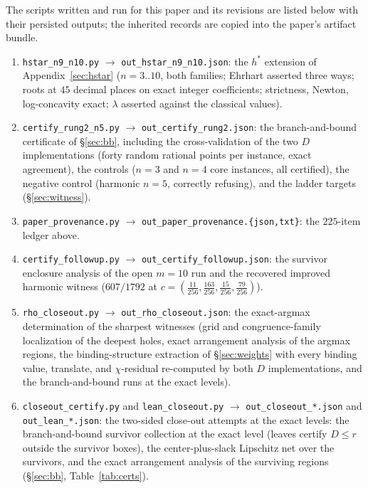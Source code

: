 \documentclass[11pt,a4paper]{article}
\numberwithin{equation}{section}
\theoremstyle{plain}
\theoremstyle{definition}
\theoremstyle{remark}
\begin{document}
The scripts written and run for this paper and its revisions are listed
below with their persisted outputs; the inherited records are copied
into the paper's artifact bundle.

\begin{enumerate}[leftmargin=1.6em,itemsep=2pt]
\item \texttt{hstar\_n9\_n10.py} $\to$ \texttt{out\_hstar\_n9\_n10.json}:
the $h^*$ extension of Appendix~\ref{sec:hstar} ($n=3..10$, both
families; Ehrhart asserted three ways; roots at $45$ decimal places on
exact integer coefficients; strictness, Newton, log-concavity exact;
$\lambda$ asserted against the classical values).
\item \texttt{certify\_rung2\_n5.py} $\to$
\texttt{out\_certify\_rung2.json}: the branch-and-bound certificate of
\S\ref{sec:bb}, including the cross-validation of the two $D$
implementations (forty random rational points per instance, exact
agreement), the controls ($n=3$ and $n=4$ core instances, all
certified), the negative control (harmonic $n=5$, correctly refusing),
and the ladder targets (\S\ref{sec:witness}).
\item \texttt{paper\_provenance.py} $\to$
\texttt{out\_paper\_provenance.\{json,txt\}}: the $225$-item ledger
above.
\item \texttt{certify\_followup.py} $\to$
\texttt{out\_certify\_followup.json}: the survivor enclosure analysis
of the open $m=10$ run and the recovered improved harmonic witness
($607/1792$ at $c=(\tfrac{11}{256},\tfrac{163}{256},
\tfrac{15}{256},\tfrac{79}{256})$).
\item \texttt{rho\_closeout.py} $\to$ \texttt{out\_rho\_closeout.json}:
the exact-argmax determination of the sharpest witnesses (grid and
congruence-family localization of the deepest holes, exact arrangement
analysis of the argmax regions, the binding-structure extraction of
\S\ref{sec:weights} with every binding value, translate, and
$\chi$-residual re-computed by both $D$ implementations, and the
branch-and-bound runs at the exact levels).
\item {\sloppy\texttt{closeout\_certify.py} and \texttt{lean\_closeout.py} $\to$
\texttt{out\_closeout\_*.json} and \texttt{out\_lean\_*.json}: the
two-sided close-out attempts at the exact levels: the branch-and-bound
survivor collection at the exact level (leaves certify $D\le r$ outside
the survivor boxes), the center-plus-slack Lipschitz net over the
survivors, and the exact arrangement analysis of the surviving regions
(\S\ref{sec:bb}, Table~\ref{tab:certs}).\par}

\end{enumerate}
\end{document}
